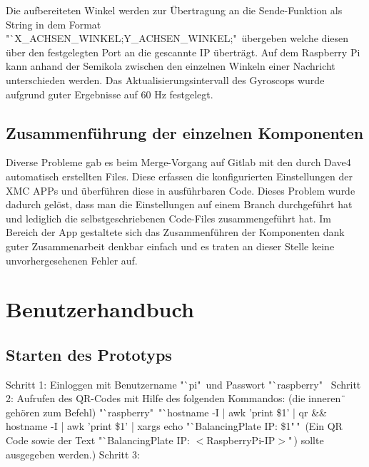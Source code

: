 \documentclass[12pt,a4paper,bibliography=totoc,listof=totoc]{scrartcl}
\begin{document}
Die aufbereiteten Winkel werden zur Übertragung an die Sende-Funktion als String in dem Format 
"`X\_ACHSEN\_WINKEL;Y\_ACHSEN\_WINKEL;"\ übergeben welche diesen über den festgelegten Port an die gescannte IP überträgt.
Auf dem Raspberry Pi kann anhand der Semikola zwischen den einzelnen Winkeln einer Nachricht unterschieden werden. 
Das Aktualisierungsintervall des Gyroscops wurde aufgrund guter Ergebnisse auf 60 Hz festgelegt. 

\subsection{Zusammenführung der einzelnen Komponenten}
Diverse Probleme gab es beim Merge-Vorgang auf Gitlab mit den durch Dave4 automatisch erstellten Files. 
Diese erfassen die konfigurierten Einstellungen der XMC APPs und überführen diese in ausführbaren Code. 
Dieses Problem wurde dadurch gelöst, dass man die Einstellungen auf einem Branch durchgeführt hat und 
lediglich die selbstgeschriebenen Code-Files zusammengeführt hat. Im Bereich der App gestaltete sich das 
Zusammenführen der Komponenten dank guter Zusammenarbeit denkbar einfach und es traten an dieser Stelle 
keine unvorhergesehenen Fehler auf.

\pagebreak
\section{Benutzerhandbuch}
\subsection{Starten des Prototyps}
Schritt 1:
Einloggen mit Benutzername "`pi"\ und Passwort "`raspberry"\
\newline
Schritt 2: Aufrufen des QR-Codes mit Hilfe des folgenden Kommandos: 
\newline(die inneren \"\, gehören zum Befehl)
\newline\newline
"`raspberry"\ "`hostname -I | awk '{print \$1}' | qr \&\& hostname -I | awk '{print \$1}' | xargs echo "`BalancingPlate IP: \$1"\,"\,
\newline\newline
    (Ein QR Code sowie der Text "`BalancingPlate IP: $<$RaspberryPi-IP$>$"\,) sollte ausgegeben werden.)
\newline
Schritt 3:
\end{document}
